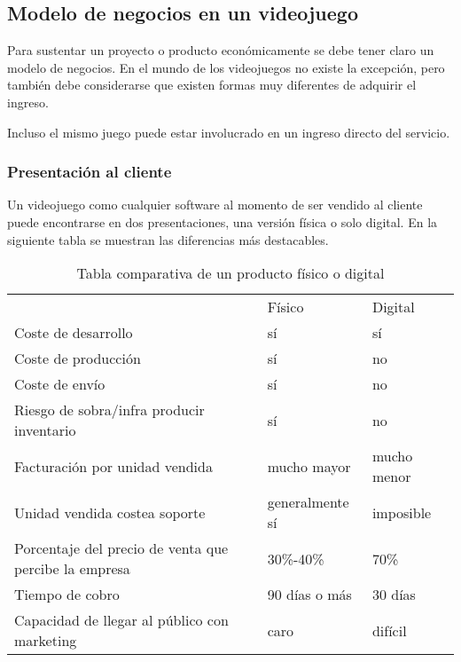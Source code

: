 \subsection{Modelo de negocios en un videojuego}\label{modeloNegocio}
Para sustentar un proyecto o producto económicamente se debe tener claro un modelo de negocios. En el mundo de los videojuegos no existe la excepción, pero también debe considerarse que existen formas muy diferentes de adquirir el ingreso.

Incluso el mismo juego puede estar involucrado en un ingreso directo del servicio.
	
\subsubsection{Presentación al cliente}
Un videojuego como cualquier software al momento de ser vendido al cliente puede encontrarse en dos presentaciones, una versión física o solo digital. En la siguiente tabla \cite{fiDi} se muestran las diferencias más destacables.

\begin{table}[htbp]
	\centering
	\caption{Tabla comparativa de un producto físico o digital}
	\label{fiDi}
	\begin{tabular}{lll}
		& Físico          & Digital     \\
		Coste de desarrollo                                   & sí              & sí          \\
		Coste de producción                                   & sí              & no          \\
		Coste de envío                                        & sí              & no          \\
		Riesgo de sobra/infra producir inventario             & sí              & no          \\
		Facturación por unidad vendida                        & mucho mayor     & mucho menor \\
		Unidad vendida costea soporte                         & generalmente sí & imposible   \\
		Porcentaje del precio de venta que percibe la empresa & 30\%-40\%       & 70\%        \\
		Tiempo de cobro                                       & 90 días o más   & 30 días     \\
		Capacidad de llegar al público con marketing          & caro            & difícil
	\end{tabular}
\end{table}


